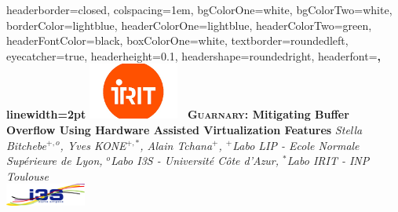 \documentclass[landscape,a0paper,fontscale=0.3]{baposter} %
\begin{document}
\begin{poster}
{
headerborder=closed, %
colspacing=1em, %
bgColorOne=white, %
bgColorTwo=white, %
borderColor=lightblue, %
headerColorOne=lightblue, %
headerColorTwo=green, %
headerFontColor=black, %
boxColorOne=white, %
textborder=roundedleft, %
eyecatcher=true, %
headerheight=0.1\textheight, %
headershape=roundedright, %
headerfont=\Large\bf\textsc, %
linewidth=2pt %
}
%
{\includegraphics[height=5em]{irit.png}} %
%
{\bf\LARGE\ \textsc{Guarnary}: Mitigating Buffer Overflow Using Hardware Assisted Virtualization Features} %
{\textsl{\small Stella Bitchebe$^{+,o}$, Yves KONE$^{+,*}$, Alain Tchana$^{+}$, $^{+}$Labo LIP - Ecole Normale Sup\'erieure de Lyon, $^{o}$Labo I3S - Université Côte d'Azur, $^{*}$Labo IRIT - INP Toulouse}\\ \vspace{0.2em}
\includegraphics[height=2em]{I3S.png}
\hspace*{6em}
}
\end{poster}
\end{document}
